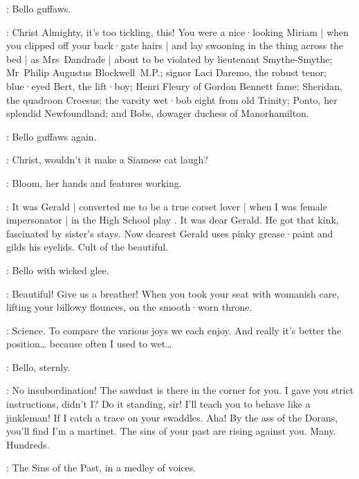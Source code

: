 :
Bello guffaws.

\Bello:
Christ Almighty,
it's too tickling,
this!
You were a nice·looking Miriam |
when you clipped off your back·gate hairs |
%
and lay swooning in the thing across the bed |
as Mrs~Dandrade |
about to be violated by lieutenant Smythe-Smythe;
Mr~Philip Augustus Blockwell~M.P.;
signor Laci Daremo,
the robust tenor;
blue·eyed Bert,
the lift·boy;
Henri Fleury of Gordon Bennett fame;
Sheridan,
the quadroon Croesus;
the varsity wet·bob eight from old Trinity;
Ponto,
her splendid Newfoundland;
and Bobs,
dowager duchess of Manorhamilton.

:
Bello guffaws again.

\Bello:
Christ,
wouldn't it make a Siamese cat laugh?

:
Bloom,
her hands and features working.

\Bloom:
It was Gerald |
converted me to be a true corset lover |
%
when I was female impersonator |
in the High School play .
It was dear Gerald.
He got that kink,
fascinated by sister's stays.
Now dearest Gerald uses pinky grease·paint and gilds his eyelids.
Cult of the beautiful.

:
Bello with wicked glee.

\Bello:
Beautiful!
Give us a breather!
When you took your seat with womanish care,
lifting your billowy flounces,
on the smooth·worn throne.

\Bloom:
Science.
To compare the various joys we each enjoy.
And really it's better the position…
%
because often I used to wet…

:
Bello,
sternly.

\Bello:
No insubordination!
The sawdust is there in the corner for you.
I gave you strict instructions,
didn't I?
Do it standing,
sir!
I'll teach you to behave like a jinkleman!
If I catch a trace on your swaddles.
Aha!
By the ass of the Dorans,
you'll find I'm a martinet.
The sins of your past are rising against you.
Many.
Hundreds.


:
The Sins of the Past,
in a medley of voices.

